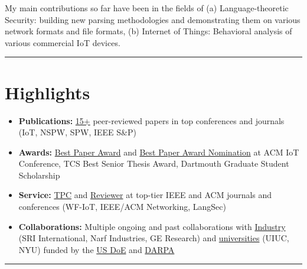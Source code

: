 \documentclass[letterpaper,10pt]{article}
\begin{document}
My main contributions so far have been in the fields of (a) Language-theoretic Security: building new parsing methodologies and demonstrating them on various network formats and file formats, (b) Internet of Things: Behavioral analysis of various commercial IoT devices.

\vspace{0.5cm}
\hrule

\section*{\color{dartmouthgreen} Highlights}

\begin{itemize}
  \item \textbf{Publications:} \ul{15+} peer-reviewed papers in top conferences and journals (IoT, NSPW, SPW, IEEE S\&P)
  \item \textbf{Awards:} \ul{Best Paper Award} and \ul{Best Paper Award Nomination} at ACM IoT Conference, TCS Best Senior Thesis Award, Dartmouth Graduate Student Scholarship
  \item \textbf{Service:} \ul{TPC} and \ul{Reviewer} at top-tier IEEE and ACM journals and conferences (WF-IoT, IEEE/ACM Networking, LangSec)
  \item \textbf{Collaborations:} Multiple ongoing and past collaborations with \ul{Industry} (SRI International, Narf Industries, GE Research) and \ul{universities} (UIUC, NYU) funded by the \ul{US DoE} and \ul{DARPA}
\end{itemize}

\hrule
\end{document}
